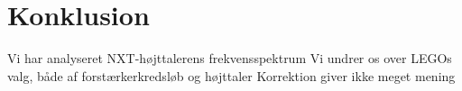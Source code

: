 \section{Konklusion}
Vi har analyseret NXT-højttalerens frekvensspektrum
Vi undrer os over LEGOs valg, både af forstærkerkredsløb og højttaler
Korrektion giver ikke meget mening